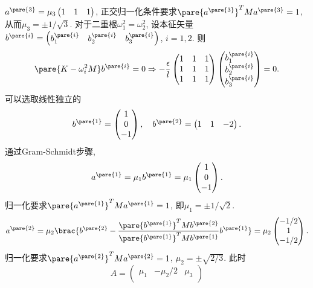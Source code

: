 \documentclass[../LectureNotes.tex]{subfiles}
\begin{document}
\begin{sample}
\begin{ex}
        $a^{\pare{3}} = \mu_3 \begin{pmatrix}
            1 & 1 & 1
        \end{pmatrix}$, 正交归一化条件要求$\pare{a^{\pare{3}}}^T Ma^{\pare{3}} = 1$, 从而$\mu_3 = \pm 1/\sqrt{3}$. 对于二重根$\omega_1^2 = \omega_2^2$, 设本征矢量$b^{\pare{i}} = \begin{pmatrix}
            b_1^{\pare{i}} & b_2^{\pare{i}} & b_3^{\pare{i}}
        \end{pmatrix}$, $i=1,2$. 则
        \[ \pare{K - \omega_i^2 M}b^{\pare{i}} = 0 \Rightarrow -\frac{\epsilon}{l}\begin{pmatrix}
            1 & 1 & 1 \\
            1 & 1 & 1 \\
            1 & 1 & 1
        \end{pmatrix}\begin{pmatrix}
            b_1^{\pare{i}} \\ b_2^{\pare{i}} \\ b_3^{\pare{i}}
        \end{pmatrix} = 0. \]
        可以选取线性独立的
        \[ b^{\pare{1}} = \begin{pmatrix}
            1 \\ 0 \\ -1
        \end{pmatrix},\quad b^{\pare{2}} = \begin{pmatrix}
            1 & 1 & -2
        \end{pmatrix}. \]
        通过Gram-Schmidt步骤,
        \[ a^{\pare{1}} = \mu_1 b^{\pare{1}} = \mu_1 \begin{pmatrix}
            1 \\ 0 \\ -1
        \end{pmatrix}. \]
        归一化要求$\pare{a^{\pare{1}}}^T M a^{\pare{1}} = 1$, 即$\mu_1 = \pm 1/\sqrt{2}$.
        \[ a^{\pare{2}} = \mu_2 \brac{b^{\pare{2}} - \frac{\pare{b^{\pare{1}}}^T M b^{\pare{2}}}{\pare{b^{\pare{1}}}^T M b^{\pare{1}}}b^{\pare{1}}} = \mu_2 \begin{pmatrix}
            -1/2 \\ 1 \\ -1/2
        \end{pmatrix}. \]
        归一化要求$\pare{a^{\pare{2}}}^T M a^{\pare{2}} = 1$, $\mu_2 = \pm \sqrt{2/3}$. 此时
        \[ A = \begin{pmatrix}
            \mu_1 & -\mu_2/2 & \mu_3 \\

\end{pmatrix}\]
\end{ex}
\end{sample}
\end{document}
